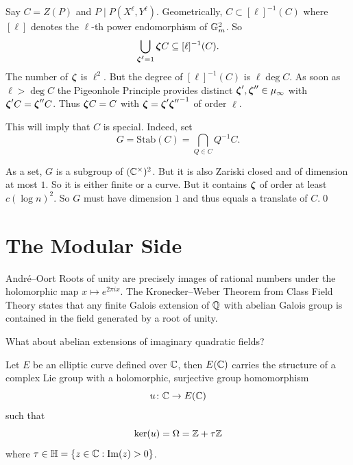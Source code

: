 \documentclass{beamer}
\begin{document}
\begin{frame}
  Say $C=Z(P)$ and $P\mid P(X^\ell,Y^\ell)$. 
  Geometrically, $C \subset [\ell]^{-1}(C)$ where $[\ell]$ denotes the $\ell$-th
  power endomorphism of ${\mathbb{G}}_m^2$.
  So
  \begin{equation*}
    \bigcup_{{\boldsymbol{\zeta}}^\ell=1} {\boldsymbol{\zeta}} C \subseteq [\ell]^{-1}(C).
  \end{equation*}
  The number of ${\boldsymbol{\zeta}}$ is
  $\ell^2$. But the degree of $[\ell]^{-1}(C)$ is $\ell \deg C$. As soon
  as $\ell > \deg C$ the Pigeonhole Principle provides distinct
  ${\boldsymbol{\zeta}}',{\boldsymbol{\zeta}}''\in \mu_\infty$ with ${\boldsymbol{\zeta}}' C = {\boldsymbol{\zeta}}''C$.
  Thus
  ${\boldsymbol{\zeta}} C=C$ with ${\boldsymbol{\zeta}} = {\boldsymbol{\zeta}}'{{\boldsymbol{\zeta}}''}^{-1}$ of order
  $\ell$.

  

  This will imply that $C$ is special. Indeed, set
  \begin{equation*}
    G =  \mathrm{Stab}(C) = \bigcap_{Q\in C} Q^{-1} C.
  \end{equation*}

  As a set, $G$ is a subgroup of $({\mathbb{C}}^\times)^2$. But it is also Zariski
  closed and of dimension at most $1$. So it is either finite or a
  curve. But it contains  ${\boldsymbol{\zeta}}$ of order at least $c(\log n)^2$.
  So $G$ must have dimension $1$ and
   thus  equals a translate of $C$.\qed
\end{frame}

\section{The Modular Side}
\begin{frame}{Andr\'e--Oort}
  Roots of unity are precisely images of rational numbers under the
  holomorphic map $x\mapsto e^{2\pi i x}$. The Kronecker--Weber
  Theorem from Class Field Theory states that any finite Galois
  extension of ${\mathbb{Q}}$ with abelian Galois group is contained in the field
  generated by a root of unity.

  What about abelian extensions of imaginary quadratic fields?

  Let $E$ be an elliptic curve  defined over ${\mathbb{C}}$, then
  $E({\mathbb{C}})$ carries the structure of
  a complex Lie group with a holomorphic, surjective group homomorphism
  \begin{equation*}
    u \colon {\mathbb{C}} \rightarrow E({\mathbb{C}})
  \end{equation*}
  such that
  \begin{equation*}
    \mathrm{ker}(u) =\Omega = {\mathbb{Z}}+\tau{\mathbb{Z}}
  \end{equation*}
  where $\tau\in {\mathbb{H}} = \{z\in {\mathbb{C}} : \mathrm{Im}(z)>0\}$. 
\end{frame}
\end{document}
